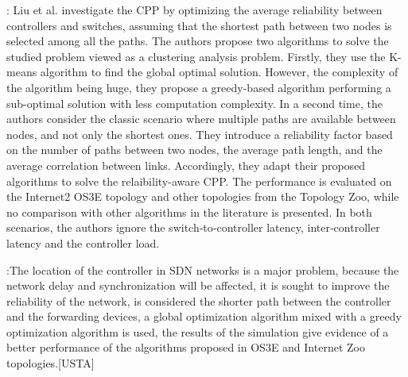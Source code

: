 \documentclass[a4paper,10pt]{article}
\begin{document}
\cite{LiLi16}: Liu et al. investigate the CPP by optimizing the average reliability between controllers and switches, assuming that the shortest path between two nodes is selected among all the paths. The authors propose two algorithms to solve the studied problem viewed as a clustering analysis problem. Firstly, they use the K-means algorithm to find the global optimal solution. However, the complexity of the algorithm being huge, they propose a greedy-based algorithm performing a sub-optimal solution with less computation complexity. In a second time, the authors consider the classic scenario where multiple paths are available between nodes, and not only the shortest ones. They introduce a reliability factor based on the number of paths between two nodes, the average path length, and the average correlation between links. Accordingly, they adapt their proposed algorithms to solve the relaibility-aware CPP. The performance is evaluated on the Internet2 OS3E topology and other topologies from the Topology Zoo, while no comparison with other algorithms in the literature is presented. In both scenarios, the authors ignore the switch‐to‐controller latency, inter‐controller latency and the controller load.

\cite{LiLi16}:The location of the controller in SDN networks is a major problem, because the network delay and synchronization will be affected, it is sought to improve the reliability of the network, is considered the shorter path between the controller and the forwarding devices,  a global optimization algorithm mixed with a greedy optimization algorithm is used, the results of the simulation give evidence of a better performance of the algorithms proposed in OS3E and Internet Zoo topologies.[USTA]
\end{document}
